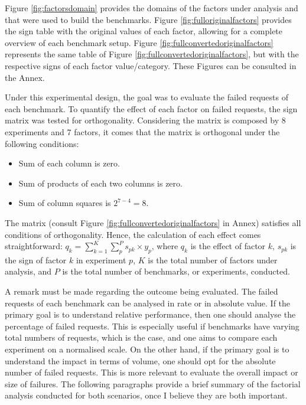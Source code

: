 \documentclass[runningheads]{llncs}
\begin{document}
Figure \ref{fig:factorsdomain} provides the domains of the factors under analysis and that were used to build the benchmarks.
Figure \ref{fig:fulloriginalfactors} provides the sign table with the original values of each factor, allowing for a complete overview of each benchmark setup.
Figure \ref{fig:fullconvertedoriginalfactors} represents the same table of Figure \ref{fig:fullconvertedoriginalfactors}, but with the respective signs of each factor value/category.
These Figures can be consulted in the Annex.



Under this experimental design, the goal was to evaluate the failed requests of each benchmark.
To quantify the effect of each factor on failed requests, the sign matrix was tested for orthogonality. Considering the matrix is composed by 8 experiments and 7 factors, it comes that the matrix is orthogonal under the following conditions:

\begin{itemize}
    \item Sum of each column is zero.
    \item Sum of products of each two columns is zero.
    \item Sum of column squares is $2^{7-4} = 8$.
\end{itemize}

The matrix (consult Figure \ref{fig:fullconvertedoriginalfactors} in Annex) satisfies all conditions of orthogonality. Hence, the calculation of each effect comes straightforward: $q_{k}=\sum_{k=1}^{K}\sum_{p}^{P}s_{pk} \times y_{p}$, where $q_{k}$ is the effect of factor $k$, $s_{pk}$ is the sign of factor $k$ in experiment $p$, $K$ is the total number of factors under analysis, and $P$ is the total number of benchmarks, or experiments, conducted.

A remark must be made regarding the outcome being evaluated. The failed requests of each benchmark can be analysed in rate or in absolute value. If the primary goal is to understand relative performance, then one should analyse the percentage of failed requests. This is especially useful if benchmarks have varying total numbers of requests, which is the case, and one aims to compare each experiment on a normalised scale. On the other hand, if the primary goal is to understand the impact in terms of volume, one should opt for the absolute number of failed requests. This is more relevant to evaluate the overall impact or size of failures. The following paragraphs provide a brief summary of the factorial analysis conducted for both scenarios, once I believe they are both important.
\end{document}
